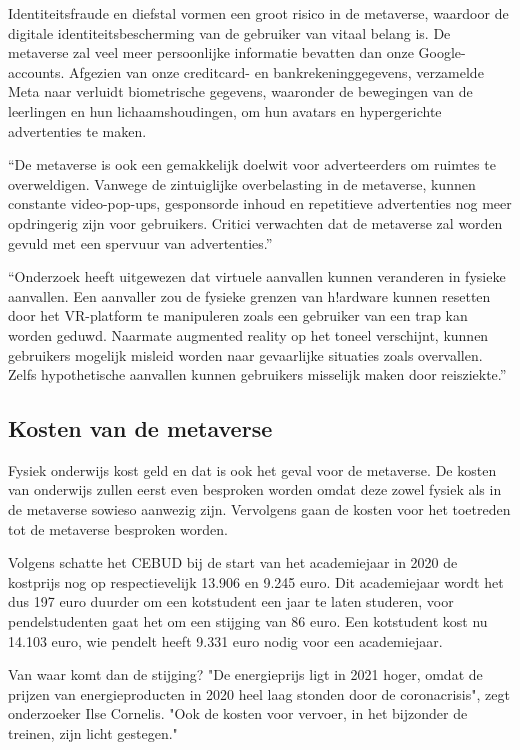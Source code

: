 \documentclass{hogent-article}
\begin{document}
Identiteitsfraude en diefstal vormen een groot risico in de metaverse, waardoor de digitale identiteitsbescherming van de gebruiker van vitaal belang is. De metaverse zal veel meer persoonlijke informatie bevatten dan onze Google-accounts. Afgezien van onze creditcard- en bankrekeninggegevens, verzamelde Meta naar verluidt biometrische gegevens, waaronder de bewegingen van de leerlingen en hun lichaamshoudingen, om hun avatars en hypergerichte advertenties te maken. 

``De metaverse is ook een gemakkelijk doelwit voor adverteerders om ruimtes te overweldigen. Vanwege de zintuiglijke overbelasting in de metaverse, kunnen constante video-pop-ups, gesponsorde inhoud en repetitieve advertenties nog meer opdringerig zijn voor gebruikers. Critici verwachten dat de metaverse zal worden gevuld met een spervuur van advertenties.'' \autocite{CHATTERJEE2022}

``Onderzoek heeft uitgewezen dat virtuele aanvallen kunnen veranderen in fysieke aanvallen. Een aanvaller zou de fysieke grenzen van h!ardware kunnen resetten door het VR-platform te manipuleren zoals een gebruiker van een trap kan worden geduwd. Naarmate augmented reality op het toneel verschijnt, kunnen gebruikers mogelijk misleid worden naar gevaarlijke situaties zoals overvallen. Zelfs hypothetische aanvallen kunnen gebruikers misselijk maken door reisziekte.'' \autocite{CHATTERJEE2022}



\subsection{Kosten van de metaverse}
Fysiek onderwijs kost geld en dat is ook het geval voor de metaverse. De kosten van onderwijs zullen eerst even besproken worden omdat deze zowel fysiek als in de metaverse sowieso aanwezig zijn. Vervolgens gaan de kosten voor het toetreden tot de metaverse besproken worden. 

Volgens \textcite{Ellen2021} schatte het CEBUD bij de start van het academiejaar in 2020 de kostprijs nog op respectievelijk 13.906 en 9.245 euro. Dit academiejaar wordt het dus 197 euro duurder om een kotstudent een jaar te laten studeren, voor pendelstudenten gaat het om een stijging van 86 euro. Een kotstudent kost nu 14.103 euro, wie pendelt heeft 9.331 euro nodig voor een academiejaar. 

Van waar komt dan de stijging? "De energieprijs ligt in 2021 hoger, omdat de prijzen van energieproducten in 2020 heel laag stonden door de coronacrisis", zegt onderzoeker Ilse Cornelis. "Ook de kosten voor vervoer, in het bijzonder de treinen, zijn licht gestegen."
\end{document}
